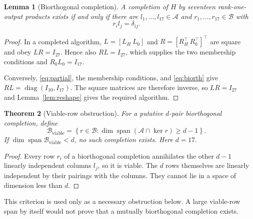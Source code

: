\documentclass[11pt]{article}
\newtheorem{theorem}{Theorem}[section]
\newtheorem{lemma}[theorem]{Lemma}
\theoremstyle{definition}\newtheorem{definition}[theorem]{Definition}
\newcommand{\Span}{\operatorname{span}}
\newcommand{\diag}{\operatorname{diag}}
\begin{document}
\begin{lemma}[Biorthogonal completion]\label{lem:completion}
A completion of $H$ by seventeen rank-one-output products exists if and only if there are $l_1,\ldots,l_{17}\in\mathcal A$ and $r_1,\ldots,r_{17}\in\mathcal B$ with
\begin{equation}\label{eq:biorth}
r_i l_j=\delta_{ij}.
\end{equation}
\end{lemma}
\begin{proof}
In a completed algorithm, $L=[L_H\ L_0]$ and $R=[R_H^\top\ R_0^\top]^\top$ are square and obey $LR=I_{27}$. Hence also $RL=I_{27}$, which supplies the two membership conditions and $R_0L_0=I_{17}$.

Conversely, \eqref{eq:partial}, the membership conditions, and \eqref{eq:biorth} give $RL=\diag(I_{10},I_{17})$. The square matrices are therefore inverse, so $LR=I_{27}$ and Lemma~\ref{lem:reshape} gives the required algorithm.
\end{proof}

\begin{theorem}[Viable-row obstruction]\label{thm:viable}
For a putative $d$-pair biorthogonal completion, define
\[
\mathcal B_{\mathrm{viable}}=
\left\{r\in\mathcal B:\dim\Span(\mathcal A\cap\ker r)\ge d-1\right\}.
\]
If $\dim\Span\mathcal B_{\mathrm{viable}}<d$, no such completion exists. Here $d=17$.
\end{theorem}
\begin{proof}
Every row $r_i$ of a biorthogonal completion annihilates the other $d-1$ linearly independent columns $l_j$, so it is viable. The $d$ rows themselves are linearly independent by their pairings with the columns. They cannot lie in a space of dimension less than $d$.
\end{proof}

This criterion is used only as a necessary obstruction below. A large viable-row span by itself would not prove that a mutually biorthogonal completion exists.
\end{document}

